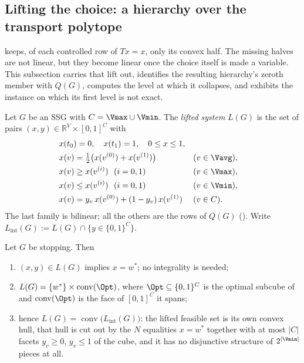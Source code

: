 
\subsection{Lifting the choice: a hierarchy over the transport polytope}
\label{sec:choicelift}

 keeps, of each controlled row of $Tx=x$, only its convex
half. The missing halves are not linear, but they become linear once the choice
itself is made a variable. This subsection carries that lift out, identifies
the resulting hierarchy's zeroth member with $Q(G)$, computes the level at
which it collapses, and exhibits the instance on which its first level is not
exact.

\begin{definition}\label{cl:lift}
Let $G$ be an SSG with $C=\Vmax\cup\Vmin$. The \emph{lifted system} $L(G)$ is
the set of pairs $(x,y)\in\mathbb R^{V}\times[0,1]^{C}$ with
\[
 \begin{aligned}
  &x(t_0)=0,\quad x(t_1)=1,\quad 0\le x\le 1,\\
  &x(v)=\tfrac12\bigl(x(v^{(0)})+x(v^{(1)})\bigr) &&(v\in\Vavg),\\
  &x(v)\ge x(v^{(i)})\ \ (i=0,1) &&(v\in\Vmax),\\
  &x(v)\le x(v^{(i)})\ \ (i=0,1) &&(v\in\Vmin),\\
  &x(v)=y_v\,x(v^{(0)})+(1-y_v)\,x(v^{(1)}) &&(v\in C).
 \end{aligned}
\]
The last family is bilinear; all the others are the rows of $Q(G)$
(). Write $L_{\mathrm{int}}(G):=L(G)\cap\{y\in\{0,1\}^{C}\}$.
\end{definition}

\begin{proposition}\label{cl:exact-lift}
Let $G$ be stopping. Then
\begin{enumerate}[label=(\alph*),leftmargin=2.2em]
\item $(x,y)\in L(G)$ implies $x=w^{\ast}$; no integrality is needed;
\item $L(G)=\{w^{\ast}\}\times\operatorname{conv}(\Opt)$, where
      $\Opt\subseteq\{0,1\}^{C}$ is the optimal subcube of
       and $\operatorname{conv}(\Opt)$ is the face of
      $[0,1]^{C}$ it spans;
\item hence $L(G)=\operatorname{conv}\bigl(L_{\mathrm{int}}(G)\bigr)$: the
      lifted feasible set is its own convex hull, that hull is cut out by the
      $N$ equalities $x=w^{\ast}$ together with at most $|C|$ facets
      $y_v\ge0$, $y_v\le1$ of the cube, and it has no disjunctive structure of
      $2^{|\Vmin|}$ pieces at all.
\end{enumerate}
\end{proposition}

